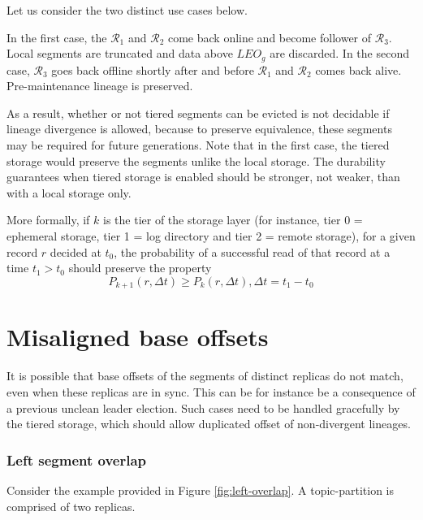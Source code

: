 \documentclass{article}
\begin{document}
Let us consider the two distinct use cases below.

\begin{outline}[enumerate]
	\1 In the first case, the $\mathcal{R}_1$ and $\mathcal{R}_2$ come back online and become follower of $\mathcal{R}_3$. Local segments are truncated and data above $LEO_g$ are discarded.
	\1 In the second case,  $\mathcal{R}_3$ goes back offline shortly after and before $\mathcal{R}_1$ and $\mathcal{R}_2$ comes back alive. Pre-maintenance lineage is preserved.  
\end{outline}

As a result, whether or not tiered segments can be evicted is not decidable if lineage divergence is allowed, because to preserve equivalence, these segments may be required for future generations.
Note that in the first case, the tiered storage would preserve the segments unlike the local storage. The durability guarantees when tiered storage is enabled should be stronger, not weaker, than with a local storage only.

More formally, if $k$ is the tier of the storage layer (for instance, tier 0 = ephemeral storage, tier 1 = log directory and tier 2 = remote storage), for a given record $r$ decided at $t_0$, the probability of a successful read of that record at a time $t_1 > t_0$ should preserve the property
\[
P_{k+1}(r, \Delta t) \geq P_{k}(r, \Delta t), \Delta t = t_1 - t_0
\] 

\section{Misaligned base offsets}

It is possible that base offsets of the segments of distinct replicas do not match, even when these replicas are in sync. This can be for instance be a consequence of a previous unclean leader election. Such cases need to be handled gracefully by the tiered storage, which should allow duplicated offset of non-divergent lineages.

\subsubsection{Left segment overlap}

Consider the example provided in Figure \ref{fig:left-overlap}. A topic-partition is comprised of two replicas. 
\end{document}
